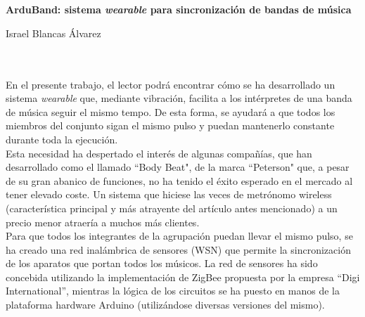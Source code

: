 \chapter*{}





\cleardoublepage
\thispagestyle{empty}

\begin{center}
{\large\bfseries ArduBand: sistema  \textit{wearable} para sincronización de bandas de música}\\
\end{center}
\begin{center}
Israel Blancas Álvarez\\
\end{center}

\\

\vspace{0.7cm}
\\
En el presente trabajo, el lector podrá encontrar cómo se ha desarrollado un sistema
\textit{wearable} que, mediante vibración, facilita a los intérpretes de una banda de
música seguir el mismo tempo. De esta forma, se ayudará a que todos los miembros del conjunto
sigan el mismo pulso y puedan mantenerlo constante durante toda la ejecución.\\

Esta necesidad ha despertado el interés de algunas compañías, que han desarrollado como el
llamado ``Body Beat", de la marca ``Peterson" que, a pesar de su gran abanico de funciones,
no ha tenido el éxito esperado en el mercado al tener elevado coste. Un sistema que hiciese las
veces de metrónomo wireless (característica principal y más atrayente del artículo antes mencionado)
a un precio menor atraería a muchos más clientes.\\

Para que todos los integrantes de la agrupación puedan llevar el mismo pulso, se ha creado una red
inalámbrica de sensores (WSN) que permite la sincronización de los aparatos que portan todos los músicos.
La red de sensores ha sido concebida utilizando la implementación de ZigBee propuesta por la empresa “Digi
International”, mientras la lógica de los circuitos se ha puesto en manos de la plataforma hardware Arduino
(utilizándose diversas versiones del mismo).\\

